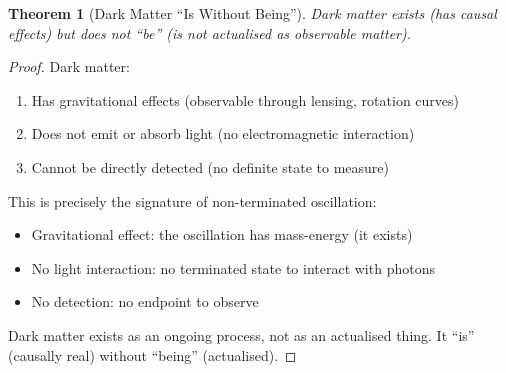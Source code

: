 \documentclass[12pt,a4paper]{article}
\newtheorem{theorem}{Theorem}[section]
\theoremstyle{definition}
\theoremstyle{remark}
\begin{document}
\begin{theorem}[Dark Matter ``Is Without Being'']
\label{thm:is_without_being}
Dark matter exists (has causal effects) but does not ``be'' (is not actualised as observable matter).
\end{theorem}

\begin{proof}
Dark matter:
\begin{enumerate}
    \item Has gravitational effects (observable through lensing, rotation curves)
    \item Does not emit or absorb light (no electromagnetic interaction)
    \item Cannot be directly detected (no definite state to measure)
\end{enumerate}

This is precisely the signature of non-terminated oscillation:
\begin{itemize}
    \item Gravitational effect: the oscillation has mass-energy (it exists)
    \item No light interaction: no terminated state to interact with photons
    \item No detection: no endpoint to observe
\end{itemize}

Dark matter exists as an ongoing process, not as an actualised thing. It ``is'' (causally real) without ``being'' (actualised).
\end{proof}
\end{document}
